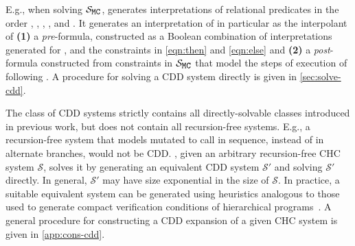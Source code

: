 E.g., when solving $\mcchc$, \sys generates interpretations of
relational predicates in the order , , ,
, and .
%
It generates an interpretation of  in particular as the
interpolant of \textbf{(1)} a \emph{pre}-formula, constructed as a
Boolean combination of interpretations generated for , 
and the constraints in \autoref{eqn:then} and \autoref{eqn:else} and %
\textbf{(2)} a \emph{post}-formula constructed from constraints in
$\mcchc$ that model the steps of execution of  following
.
%
A procedure for solving a CDD system directly is given in
\autoref{sec:solve-cdd}.

The class of CDD systems strictly contains all directly-solvable
classes introduced in previous work, but does not contain all
recursion-free systems.
%
E.g., a recursion-free system that models  mutated to
call  in sequence, instead of in alternate branches, would not
be CDD.
%
\sys, given an arbitrary recursion-free CHC system $\mathcal{S}$,
solves it by generating an equivalent CDD system $\mathcal{S}'$ and
solving $\mathcal{S}'$ directly.
%
In general, $\mathcal{S}'$ may have size exponential in the size of
$\mathcal{S}$.
%
In practice, a suitable equivalent system can be generated using
heuristics analogous to those used to generate compact verification
conditions of hierarchical programs~\cite{flanagan01,lal-qadeer15}.
%
A general procedure for constructing a CDD expansion of a given CHC
system is given in \autoref{app:cons-cdd}.


